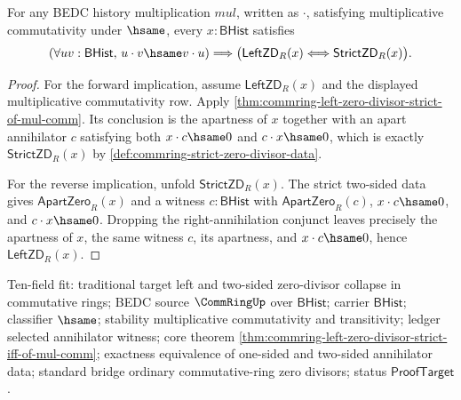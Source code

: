 \begin{theorem}
\label{thm:commring-left-zero-divisor-strict-iff-of-mul-comm}
For any BEDC history multiplication $mul$, written as $\cdot$, satisfying
multiplicative commutativity under $\hsame$, every $x:\mathsf{BHist}$
satisfies
$$
(\forall u v:\mathsf{BHist},\,u\cdot v\hsame v\cdot u)
\Longrightarrow
\bigl(\mathsf{LeftZD}_R(x)\Longleftrightarrow\mathsf{StrictZD}_R(x)\bigr).
$$
\end{theorem}
\begin{proof}
For the forward implication, assume $\mathsf{LeftZD}_R(x)$ and the displayed
multiplicative commutativity row. Apply
\autoref{thm:commring-left-zero-divisor-strict-of-mul-comm}. Its conclusion is
the apartness of $x$ together with an apart annihilator $c$ satisfying both
$x\cdot c\hsame0$ and $c\cdot x\hsame0$, which is exactly
$\mathsf{StrictZD}_R(x)$ by
\autoref{def:commring-strict-zero-divisor-data}.

For the reverse implication, unfold $\mathsf{StrictZD}_R(x)$. The strict
two-sided data gives $\mathsf{ApartZero}_R(x)$ and a witness
$c:\mathsf{BHist}$ with $\mathsf{ApartZero}_R(c)$, $x\cdot c\hsame0$, and
$c\cdot x\hsame0$. Dropping the right-annihilation conjunct leaves precisely
the apartness of $x$, the same witness $c$, its apartness, and
$x\cdot c\hsame0$, hence $\mathsf{LeftZD}_R(x)$.
\end{proof}
Ten-field fit: traditional target left and two-sided zero-divisor collapse in
commutative rings; BEDC source $\CommRingUp$ over $\mathsf{BHist}$; carrier
$\mathsf{BHist}$; classifier $\hsame$; stability multiplicative commutativity
and transitivity; ledger selected annihilator witness; core theorem
\autoref{thm:commring-left-zero-divisor-strict-iff-of-mul-comm}; exactness
equivalence of one-sided and two-sided annihilator data; standard bridge
ordinary commutative-ring zero divisors; status $\mathsf{ProofTarget}$.

